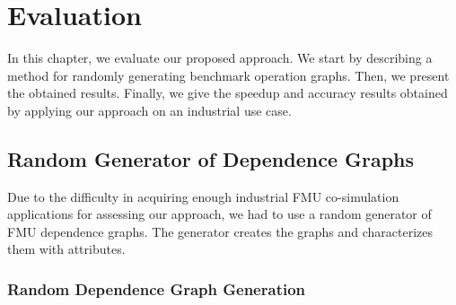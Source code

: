\chapter{\label{ch:6-eval}Evaluation}

\minitoc

In this chapter, we evaluate our proposed approach. We start by describing a method for randomly generating benchmark operation graphs. Then, we present the obtained results. Finally, we give the speedup and accuracy results obtained by applying our approach on an industrial use case.

\section{Random Generator of Dependence Graphs}

Due to the difficulty in acquiring enough industrial FMU co-simulation applications for assessing our approach, we had to use a random generator of FMU dependence graphs. The generator creates the graphs and characterizes them with attributes.

\subsection{Random Dependence Graph Generation}


